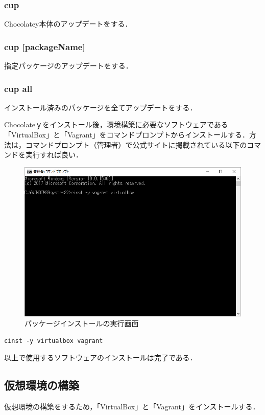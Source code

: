 \subsubsection{cup}
Chocolatey本体のアップデートをする．
\subsubsection{cup [packageName]}
指定パッケージのアップデートをする．
\subsubsection{cup all}
インストール済みのパッケージを全てアップデートをする．


\newpage

Chocolateｙをインストール後，環境構築に必要なソフトウェアである「VirtualBox」と「Vagrant」をコマンドプロンプトからインストールする．方法は，コマンドプロンプト（管理者）で公式サイトに掲載されている以下のコマンドを実行すれば良い．

\begin{figure}[htb]
\centering
\includegraphics[width=13cm]{img/choco3.png}
\caption{パッケージインストールの実行画面}
\end{figure}

\begin{lstlisting}[basicstyle=\ttfamily\footnotesize, frame=single]
cinst -y virtualbox vagrant
\end{lstlisting}

以上で使用するソフトウェアのインストールは完了である．

\newpage
\subsection{仮想環境の構築}
仮想環境の構築をするため，「VirtualBox」と「Vagrant」をインストールする．
